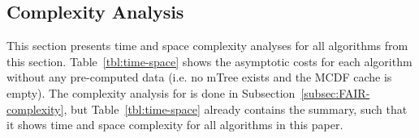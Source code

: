 \subsection{Complexity Analysis}
\begin{table}[b!]
	\caption{Time complexity for all algorithms without pre-computed results.\label{tbl:time-space}}
	\vspace{-4mm}
\end{table}

This section presents time and space complexity analyses for all algorithms from this section.
%
Table~\ref{tbl:time-space} shows the asymptotic costs for each algorithm without any pre-computed data (i.e. no mTree exists and the MCDF cache is empty).
%
The complexity analysis for \algoFAIR is done in Subsection~\ref{subsec:FAIR-complexity}, but Table~\ref{tbl:time-space} already contains the summary, such that it shows time and space complexity for all algorithms in this paper.

